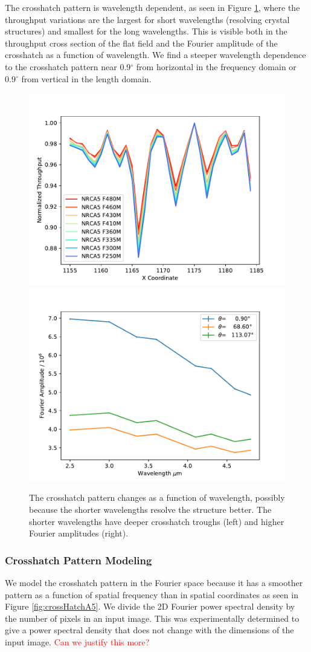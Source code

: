 \documentclass{aastex62}
\newcommand{\degree}{^\circ}
\begin{document}
The crosshatch pattern is wavelength dependent, as seen in Figure \ref{fig:crossHatchWavelengthDep}, where the throughput variations are the largest for short wavelengths (resolving crystal structures) and smallest for the long wavelengths.
This is visible both in the throughput cross section of the flat field and the Fourier amplitude of the crosshatch as a function of wavelength.
We find a steeper wavelength dependence to the crosshatch pattern near 0.9$\degree$ from horizontal in the frequency domain or 0.9$\degree$ from vertical in the length domain.

\begin{figure}[!hbtp]
\centering
\includegraphics[width=.49\columnwidth]{cross_sec_of_crosshatch.pdf}
\includegraphics[width=.49\columnwidth]{fourier_power_from_fit.pdf}
\caption{
The crosshatch pattern changes as a function of wavelength, possibly because the shorter wavelengths resolve the structure better.
The shorter wavelengths have deeper crosshatch troughs (left) and higher Fourier amplitudes (right).
}\label{fig:crossHatchWavelengthDep}
\end{figure}


\subsubsection{Crosshatch Pattern Modeling}
We model the crosshatch pattern in the Fourier space because it has a smoother pattern as a function of spatial frequency than in spatial coordinates as seen in Figure \ref{fig:crossHatchA5}.
We divide the 2D Fourier power spectral density by the number of pixels in an input image.
This was experimentally determined to give a power spectral density that does not change with the dimensions of the input image.
\textcolor{red}{Can we justify this more?}
\end{document}
